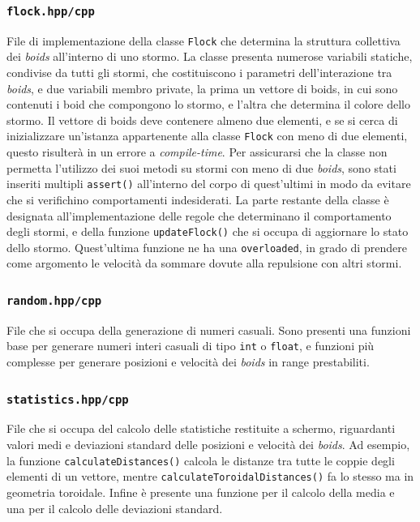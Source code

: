 \documentclass[10pt,a4paper]{article}
\begin{document}
\subsubsection{\texttt{flock.hpp/cpp}}

File di implementazione della classe \texttt{Flock} che determina la struttura collettiva dei \textit{boids} all'interno di uno stormo. La classe presenta numerose variabili statiche, condivise da tutti gli stormi, che costituiscono i parametri dell'interazione tra \textit{boids}, e due variabili membro private, la prima un vettore di boids, in cui sono contenuti i boid che compongono lo stormo, e l'altra che determina il colore dello stormo. Il vettore di boids deve contenere almeno due elementi, e se si cerca di inizializzare un'istanza appartenente alla classe \texttt{Flock} con meno di due elementi, questo risulterà in un errore a \textit{compile-time}. Per assicurarsi che la classe non permetta l'utilizzo dei suoi metodi su stormi con meno di due \textit{boids}, sono stati inseriti multipli \texttt{assert()} all'interno del corpo di quest'ultimi in modo da evitare che si verifichino comportamenti indesiderati. La parte restante della classe è designata all'implementazione delle regole che determinano il comportamento degli stormi, e della funzione \texttt{updateFlock()} che si occupa di aggiornare lo stato dello stormo. Quest'ultima funzione ne ha una \texttt{overloaded}, in grado di prendere come argomento le velocità da sommare dovute alla repulsione con altri stormi.

\subsubsection{\texttt{random.hpp/cpp}}

File che si occupa della generazione di numeri casuali. Sono presenti una funzioni base per generare numeri interi casuali di tipo \texttt{int} o \texttt{float}, e funzioni più complesse per generare posizioni e velocità dei \textit{boids} in range prestabiliti.

\subsubsection{\texttt{statistics.hpp/cpp}}

File che si occupa del calcolo delle statistiche restituite a schermo, riguardanti valori medi e deviazioni standard delle posizioni e velocità dei \textit{boids}. Ad esempio, la funzione \texttt{calculateDistances()} calcola le distanze tra tutte le coppie degli elementi di un vettore, mentre \texttt{calculateToroidalDistances()} fa lo stesso ma in geometria toroidale. Infine è presente una funzione per il calcolo della media e una per il calcolo delle deviazioni standard. 
\end{document}
